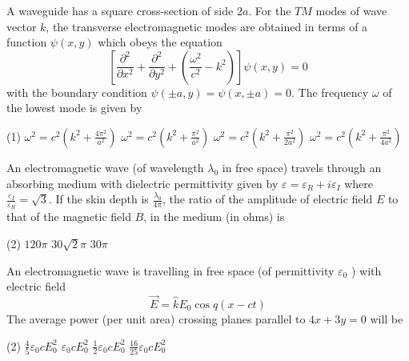 \begin{enumerate}
\begin{minipage}{\textwidth}
	\item A waveguide has a square cross-section of side $2 a$. For the $T M$ modes of wave vector $k$, the transverse electromagnetic modes are obtained in terms of a function $\psi(x, y)$ which obeys the equation
	$$
	\left[\frac{\partial^{2}}{\partial x^{2}}+\frac{\partial^{2}}{\partial y^{2}}+\left(\frac{\omega^{2}}{c^{2}}-k^{2}\right)\right] \psi(x, y)=0
	$$
	with the boundary condition $\psi(\pm a, y)=\psi(x, \pm a)=0$. The frequency $\omega$ of the lowest mode is given by
\end{minipage}
\begin{tasks}(1)
	\task[\textbf{A.}] $\omega^{2}=c^{2}\left(k^{2}+\frac{4 \pi^{2}}{a^{2}}\right)$
	\task[\textbf{B.}]$\omega^{2}=c^{2}\left(k^{2}+\frac{\pi^{2}}{a^{2}}\right)$
	\task[\textbf{C.}]$\omega^{2}=c^{2}\left(k^{2}+\frac{\pi^{2}}{2 a^{2}}\right)$
	\task[\textbf{D.}]$\omega^{2}=c^{2}\left(k^{2}+\frac{\pi^{2}}{4 a^{2}}\right)$
\end{tasks}
\begin{minipage}{\textwidth}
	\item An electromagnetic wave (of wavelength $\lambda_{0}$ in free space) travels through an absorbing medium with dielectric permittivity given by $\varepsilon=\varepsilon_{R}+i \varepsilon_{I}$ where $\frac{\varepsilon_{I}}{\varepsilon_{R}}=\sqrt{3}$. If the skin depth is $\frac{\lambda_{0}}{4 \pi}$, the ratio of the amplitude of electric field $E$ to that of the magnetic field $B$, in the medium (in ohms) is
\end{minipage}
\begin{tasks}(2)
	\task[\textbf{A.}] $120 \pi$
	\task[\textbf{C.}]$30 \sqrt{2} \pi$
	\task[\textbf{D.}] $30 \pi$
\end{tasks}
\begin{minipage}{\textwidth}
	\item An electromagnetic wave is travelling in free space (of permittivity $\varepsilon_{0}$ ) with electric field
	$$
	\vec{E}=\hat{k} E_{0} \cos q(x-c t)
	$$
	The average power (per unit area) crossing planes parallel to $4 x+3 y=0$ will be
\end{minipage}
\begin{tasks}(2)
	\task[\textbf{A.}] $\frac{4}{5} \varepsilon_{0} c E_{0}^{2}$
	\task[\textbf{B.}]$\varepsilon_{0} c E_{0}^{2}$
	\task[\textbf{C.}]$\frac{1}{2} \varepsilon_{0} c E_{0}^{2}$
	\task[\textbf{D.}] $\frac{16}{25} \varepsilon_{0} c E_{0}^{2}$
\end{tasks}


\end{enumerate}
